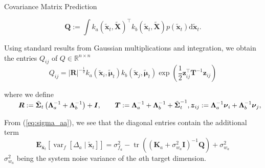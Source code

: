 \begin{frame}{Covariance Matrix Prediction}
    
\begin{equation}\label{eq:Q_integral}
    \boldsymbol{Q}:=\int k_a\left(\tilde{\boldsymbol{x}}_t, \tilde{\boldsymbol{X}}\right)^{\top} k_b\left(\tilde{\boldsymbol{x}}_t, \tilde{\boldsymbol{X}}\right) p\left(\tilde{\boldsymbol{x}}_t\right) \mathrm{d} \tilde{\boldsymbol{x}}_t .
\end{equation}

Using standard results from Gaussian multiplications and integration, we obtain the entries $Q_{i j}$ of $Q \in \mathbb{R}^{n \times n}$
\begin{equation}\label{eq:Qij}
    Q_{i j}=|\boldsymbol{R}|^{-\frac{1}{2}} k_a\left(\tilde{\boldsymbol{x}}_i, \tilde{\boldsymbol{\mu}}_t\right) k_b\left(\tilde{\boldsymbol{x}}_j, \tilde{\boldsymbol{\mu}}_t\right) \exp \left(\frac{1}{2} \boldsymbol{z}_{i j}^{\top} \boldsymbol{T}^{-1} \boldsymbol{z}_{i j}\right)
\end{equation}

where we define
$\qquad \boldsymbol{R}  :=\tilde{\boldsymbol{\Sigma}}_t\left(\boldsymbol{\Lambda}_a^{-1}+\boldsymbol{\Lambda}_b^{-1}\right)+\boldsymbol{I}, \qquad \boldsymbol{T}:=\boldsymbol{\Lambda}_a^{-1}+\boldsymbol{\Lambda}_b^{-1}+\tilde{\boldsymbol{\Sigma}}_t^{-1}, \\ \boldsymbol{z}_{i j} :=\boldsymbol{\Lambda}_a^{-1} \boldsymbol{\nu}_i+\boldsymbol{\Lambda}_b^{-1} \boldsymbol{\nu}_j,$

From (\ref{eq:sigma_aa}), we see that the diagonal entries contain the additional term
\begin{equation}\label{eq:E_xa}
\mathbf{E}_{\overline{\boldsymbol{x}}_t}\left[\operatorname{var}_f\left[\Delta_a \mid \tilde{\boldsymbol{x}}_t\right]\right]=\sigma_{f_a}^2-\operatorname{tr}\left(\left(\boldsymbol{K}_a+\sigma_{w_a}^2 \boldsymbol{I}\right)^{-1} \boldsymbol{Q}\right)+\sigma_{w_a}^2
\end{equation}
 $\sigma_{w_a}^2$ being the system noise variance of the $a$th target dimension. 
\end{frame}





